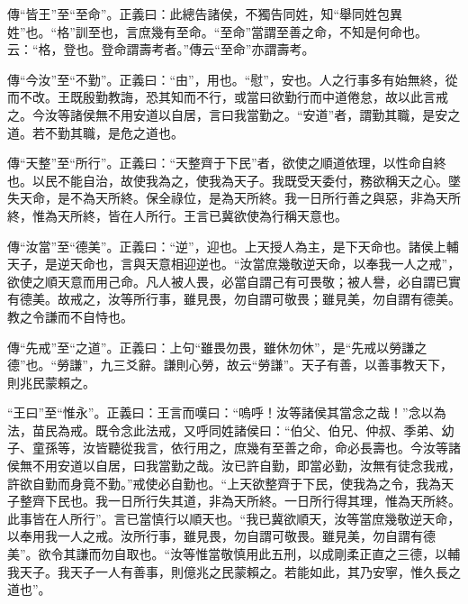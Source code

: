 {\noindent\zhuan{}\fzbyks 傳“皆王”至“至命”。正義曰：此總告諸侯，不獨告同姓，知“舉同姓包異姓”也。“格”訓至也，言庶幾有至命。“至命”當謂至善之命，不知是何命也。云：“格，登也。登命謂壽考者。”傳云“至命”亦謂壽考。 \par}

{\noindent\zhuan{}\fzbyks 傳“今汝”至“不勤”。正義曰：“由”，用也。“慰”，安也。人之行事多有始無終，從而不改。王既殷勤教誨，恐其知而不行，或當曰欲勤行而中道倦怠，故以此言戒之。今汝等諸侯無不用安道以自居，言曰我當勤之。“安道”者，謂勤其職，是安之道。若不勤其職，是危之道也。 \par}

{\noindent\zhuan{}\fzbyks 傳“天整”至“所行”。正義曰：“天整齊于下民”者，欲使之順道依理，以性命自終也。以民不能自治，故使我為之，使我為天子。我既受天委付，務欲稱天之心。墜失天命，是不為天所終。保全祿位，是為天所終。我一日所行善之與惡，非為天所終，惟為天所終，皆在人所行。王言已冀欲使為行稱天意也。 \par}

{\noindent\zhuan{}\fzbyks 傳“汝當”至“德美”。正義曰：“逆”，迎也。上天授人為主，是下天命也。諸侯上輔天子，是逆天命也，言與天意相迎逆也。“汝當庶幾敬逆天命，以奉我一人之戒”，欲使之順天意而用己命。凡人被人畏，必當自謂己有可畏敬；被人譽，必自謂已實有德美。故戒之，汝等所行事，雖見畏，勿自謂可敬畏；雖見美，勿自謂有德美。教之令謙而不自恃也。 \par}

{\noindent\zhuan{}\fzbyks 傳“先戒”至“之道”。正義曰：上句“雖畏勿畏，雖休勿休”，是“先戒以勞謙之德”也。“勞謙”，九三爻辭。謙則心勞，故云“勞謙”。天子有善，以善事教天下，則兆民蒙賴之。 \par}

{\noindent\shu{}\fzkt “王曰”至“惟永”。正義曰：王言而嘆曰：“嗚呼！汝等諸侯其當念之哉！”念以為法，苗民為戒。既令念此法戒，又呼同姓諸侯曰：“伯父、伯兄、仲叔、季弟、幼子、童孫等，汝皆聽從我言，依行用之，庶幾有至善之命，命必長壽也。今汝等諸侯無不用安道以自居，曰我當勤之哉。汝已許自勤，即當必勤，汝無有徒念我戒，許欲自勤而身竟不勤。”戒使必自勤也。“上天欲整齊于下民，使我為之令，我為天子整齊下民也。我一日所行失其道，非為天所終。一日所行得其理，惟為天所終。此事皆在人所行”。言已當慎行以順天也。“我已冀欲順天，汝等當庶幾敬逆天命，以奉用我一人之戒。汝所行事，雖見畏，勿自謂可敬畏。雖見美，勿自謂有德美”。欲令其謙而勿自取也。“汝等惟當敬慎用此五刑，以成剛柔正直之三德，以輔我天子。我天子一人有善事，則億兆之民蒙賴之。若能如此，其乃安寧，惟久長之道也”。 \par}

